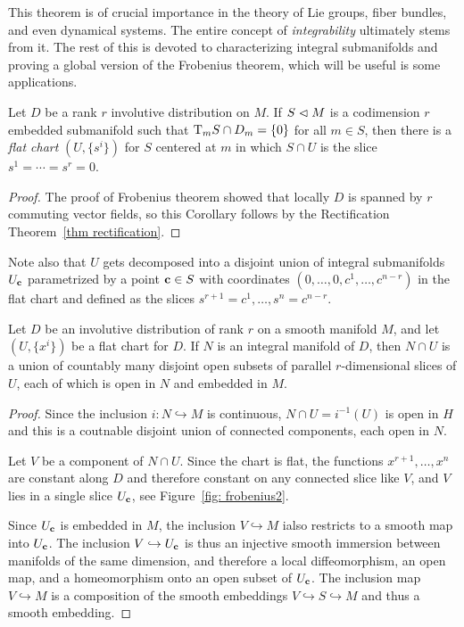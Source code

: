 This theorem is of crucial importance in the theory of Lie groups, fiber bundles, and even dynamical systems. The entire concept of \emph{integrability} ultimately stems from it. The rest of this \subsect is devoted to characterizing integral submanifolds and proving a global version of the Frobenius theorem, which will be useful is some applications.

\begin{cor}\label{cor 19.13 Lee}
    Let $D$ be a rank $r$ involutive distribution on $M$. If $S\sub M$ is a codimension $r$ embedded submanifold such that $\T_mS\cap D_m=\{0\}$ for all $m\in S$, then there is a \emph{flat chart} $(U,\{s^i\})$ for $S$ centered at $m$ in which $S\cap U$ is the slice $s^1=\cdots=s^r=0$.
\end{cor}
\begin{proof}
    The proof of Frobenius theorem showed that locally $D$ is spanned by $r$ commuting vector fields, so this Corollary follows by the Rectification Theorem~\ref{thm rectification}.
\end{proof}

Note also that $U$ gets decomposed into a disjoint union of integral submanifolds $U_{\bf{c}}$ parametrized by a point $\bf{c}\in S$ with coordinates $(0,\ldots,0,c^1,\ldots,c^{n-r})$ in the flat chart and defined as the slices $s^{r+1}=c^1,\ldots, s^n=c^{n-r}$.

\begin{prop}\label{prop 19.16 Lee}
    Let $D$ be an involutive distribution of rank $r$ on a smooth manifold $M$, and let $(U,\{x^i\})$ be a flat chart for $D$. If $N$ is an integral manifold of $D$, then $N\cap U$ is a union of countably many disjoint open subsets of parallel $r$-dimensional slices of $U$, each of which is open in $N$ and embedded in $M$.
\end{prop}
\begin{proof}
    Since the inclusion $i:N\hookrightarrow M$ is continuous, $N\cap U=i^{-1}(U)$ is open in $H$ and this is a coutnable disjoint union of connected components, each open in $N$.

    Let $V$ be a component of $N\cap U$. Since the chart is flat, the functions $x^{r+1},\ldots,x^n$ are constant along $D$ and therefore constant on any connected slice like $V$, and $V$ lies in a single slice $U_{\bf{c}}$, see Figure~\ref{fig: frobenius2}.

    Since $U_{\bf{c}}$ is embedded in $M$, the inclusion $V\hookrightarrow M$ ialso restricts to a smooth map into $U_{\bf{c}}$. The inclusion $V\hookrightarrow U_{\bf{c}}$ is thus an injective smooth immersion between manifolds of the same dimension, and therefore a local diffeomorphism, an open map, and a homeomorphism onto an open subset of $U_{\bf{c}}$. The inclusion map $V\hookrightarrow M$ is a composition of the smooth embeddings $V\hookrightarrow S\hookrightarrow M$ and thus a smooth embedding.
\end{proof}


